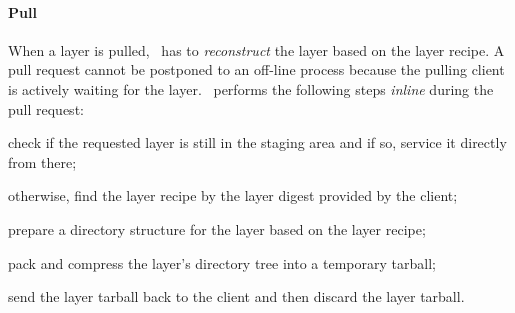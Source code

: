 \paragraph{Pull}
%
When a layer is pulled, \sysname\ has to \emph{reconstruct} the layer based
on the layer recipe.
%
A pull request cannot be postponed to an off-line process because the
pulling client is actively waiting for the layer.
%
\sysname\ performs the following steps \emph{inline} during the pull request:
%
\begin{compactenumerate}
  \item check if the requested layer is still in the staging area and if so,
	service it directly from there;
  \item otherwise, find the layer recipe by the layer digest
	provided by the client;
  \item prepare a directory structure for the layer based on the layer recipe;
  \item pack and compress the layer's directory tree into a temporary tarball;
  \item send the layer tarball back to the client and then discard the layer tarball.
\end{compactenumerate}
